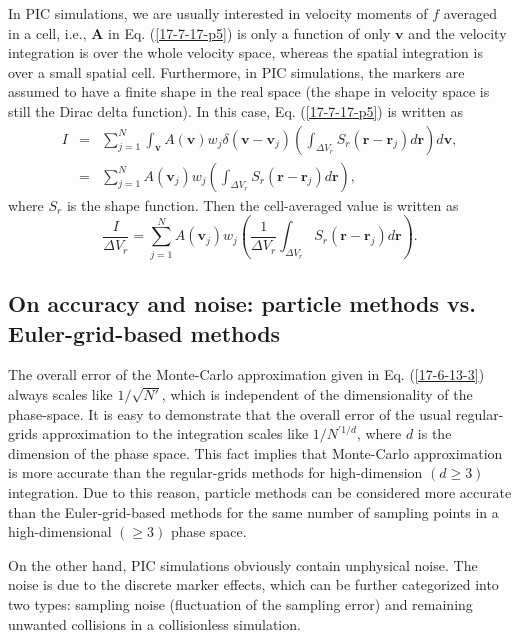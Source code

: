 \documentclass{article}
\begin{document}
In PIC simulations, we are usually interested in velocity moments of $f$
averaged in a cell, i.e., $\mathbf{A}$ in Eq. (\ref{17-7-17-p5}) is only a
function of only $\mathbf{v}$ and the velocity integration is over the whole
velocity space, whereas the spatial integration is over a small spatial cell.
Furthermore, in PIC simulations, the markers are assumed to have a finite
shape in the real space (the shape in velocity space is still the Dirac delta
function). In this case, Eq. (\ref{17-7-17-p5}) is written as
\begin{eqnarray}
  I & = & \sum_{j = 1}^N \int_{\mathbf{v}} A (\mathbf{v}) w_j \delta
  (\mathbf{v}-\mathbf{v}_j) \left( \int_{\Delta V_r} S_r
  (\mathbf{r}-\mathbf{r}_j) d\mathbf{r} \right) d\mathbf{v}, \nonumber\\
  & = & \sum_{j = 1}^N A (\mathbf{v}_j) w_j  \left( \int_{\Delta V_r} S_r
  (\mathbf{r}-\mathbf{r}_j) d\mathbf{r} \right), 
\end{eqnarray}
where $S_r$ is the shape function. Then the cell-averaged value is written as
\begin{equation}
  \frac{I}{\Delta V_r} = \sum_{j = 1}^N A (\mathbf{v}_j) w_j  \left(
  \frac{1}{\Delta V_r} \int_{\Delta V_r} S_r (\mathbf{r}-\mathbf{r}_j)
  d\mathbf{r} \right) .
\end{equation}


\subsection{On accuracy and noise: particle methods vs. Euler-grid-based
methods}

The overall error of the Monte-Carlo approximation given in Eq.
(\ref{17-6-13-3}) always scales like $1 / \sqrt{N'}$, which is independent of
the dimensionality of the phase-space. It is easy to demonstrate that the
overall error of the usual regular-grids approximation to the integration
scales like $1 / N^{\prime 1 / d}$, where $d$ is the dimension of the phase
space{\cite{Fitzpatrickcp}}. This fact implies that Monte-Carlo approximation
is more accurate than the regular-grids methods for high-dimension $(d
\geqslant 3)$ integration. Due to this reason, particle methods can be
considered more accurate than the Euler-grid-based methods for the same number
of sampling points in a high-dimensional $(\geqslant 3)$ phase space.

On the other hand, PIC simulations obviously contain unphysical noise. The
noise is due to the discrete marker effects, which can be further categorized
into two types: sampling noise (fluctuation of the sampling error) and
remaining unwanted collisions in a collisionless simulation.
\end{document}
